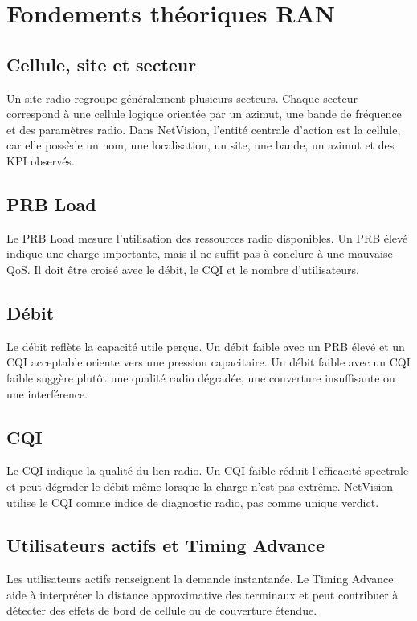 \documentclass[12pt,a4paper,oneside]{report}
\begin{document}
\chapter{Fondements théoriques RAN}
\section{Cellule, site et secteur}
Un site radio regroupe généralement plusieurs secteurs. Chaque secteur correspond à une cellule logique orientée par un azimut, une bande de fréquence et des paramètres radio. Dans NetVision, l'entité centrale d'action est la cellule, car elle possède un nom, une localisation, un site, une bande, un azimut et des KPI observés.

\section{PRB Load}
Le PRB Load mesure l'utilisation des ressources radio disponibles. Un PRB élevé indique une charge importante, mais il ne suffit pas à conclure à une mauvaise QoS. Il doit être croisé avec le débit, le CQI et le nombre d'utilisateurs.

\section{Débit}
Le débit reflète la capacité utile perçue. Un débit faible avec un PRB élevé et un CQI acceptable oriente vers une pression capacitaire. Un débit faible avec un CQI faible suggère plutôt une qualité radio dégradée, une couverture insuffisante ou une interférence.

\section{CQI}
Le CQI indique la qualité du lien radio. Un CQI faible réduit l'efficacité spectrale et peut dégrader le débit même lorsque la charge n'est pas extrême. NetVision utilise le CQI comme indice de diagnostic radio, pas comme unique verdict.

\section{Utilisateurs actifs et Timing Advance}
Les utilisateurs actifs renseignent la demande instantanée. Le Timing Advance aide à interpréter la distance approximative des terminaux et peut contribuer à détecter des effets de bord de cellule ou de couverture étendue.
\end{document}
